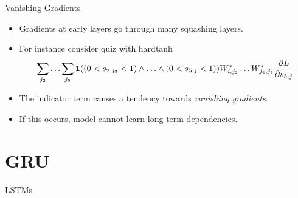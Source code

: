 \documentclass{beamer}
\begin{document}
\begin{frame}{Vanishing Gradients}
  \begin{itemize}
  \item Gradients at early layers go through many squashing layers.
    \air

  \item For instance consider quiz with  hardtanh
    \[ \sum_{j_2} \ldots \sum_{j_5} \mathbf{1}((0< s_{2, j_2} < 1)\land \ldots  \land (0<s_{5, j} < 1)) W^s_{i,j_2} \ldots W^s_{j_4,j_5}   \frac{\partial L}{\partial s_{5, j}} \]

    \air
  \item The indicator term causes a tendency towards \textit{vanishing gradients}.
   \air

  \item If this occurs, model cannot learn long-term dependencies.
 
  \end{itemize}
  
\end{frame}

\section{GRU}

\begin{frame}
  
\end{frame}

\begin{frame}{LSTMs}
  
\end{frame}
\end{document}
